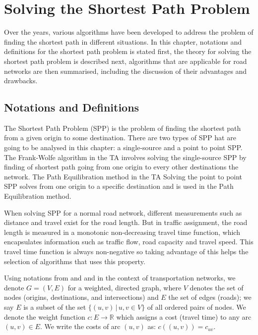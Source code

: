 \chapter{Solving the Shortest Path Problem}
\label{chap:solvingspp}

Over the years,
various algorithms have been developed 
to address the problem of finding the shortest path in different situations.
In this chapter,
notations and definitions for the shortest path problem is stated first, 
the theory for solving the shortest path problem is described next,
algorithms that are applicable for road networks are then summarised,
including the discussion of their advantages and drawbacks.


\section{Notations and Definitions}
The Shortest Path Problem (SPP) is the problem of finding the shortest path from a given origin  to some destination.
There are two types of SPP hat are going to
be analysed in this chapter:
a single-source and a point to point SPP.  
The Frank-Wolfe algorithm in the TA involves
solving the single-source SPP by finding of shortest path going from one origin to every other destinations the network.
The Path Equilibration method in the TA
Solving the point to point SPP solves from one origin to a specific destination and is used in the Path Equilibration method. 

When solving SPP for a normal road network,
different measurements such as distance and travel exist for the road length.
But in traffic assignment,
the road length is measured in a monotonic non-decreasing travel time function,
which encapsulates information such as traffic flow, road capacity and travel speed.
This travel time function is always non-negative so taking advantage of this helps the selection of algorithms that uses this property.

Using notations from \citet{Cormen} and \citet{Klunder} and in the context
of transportation networks,
we denote $ G = ( V, E ) $ for a weighted, directed graph,
where $ V $ denotes the set of nodes (origins, destinations, and intersections)
and $ E $ the set of edges (roads);
we say $ E $ is a subset of the set $ \{ (u, v)\, | \, u, v \in V \} $ of all ordered pairs of nodes.
We denote the weight function $ c : E \rightarrow \mathbb{R} $ which assigns a cost (travel time) to any arc $ (u,v) \in E $.
We write the costs of arc $(u, v)$ as: $ c((u, v)) = c_{uv} $.

